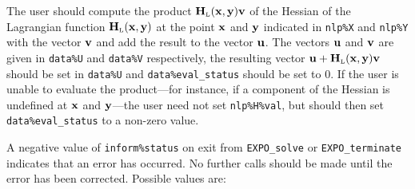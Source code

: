 \documentclass{galahad}
\newcommand{\packagename}{EXPO}
\newcommand{\bmHL}{\bmH\sub{L}}
\begin{document}
\begin{description}
 The user should compute the product $\bmHL(\bmx,\bmy) \bmv$ of the 
     Hessian of the Lagrangian function $\bmHL(\bmx,\bmy)$ at the point 
     ${\mathbf{x}}$ and ${\mathbf{y}}$ indicated in {\tt nlp\%X}  and {\tt nlp\%Y} with the 
     vector ${\mathbf{v}}$ and add the result to
     the vector ${\mathbf{u}}$. The vectors ${\mathbf{u}}$ and ${\mathbf{v}}$ are given in
     {\tt data\%U} and {\tt data\%V} respectively, the resulting
     vector $\bmu + \bmHL(\bmx,\bmy)\bmv$ should be set in {\tt data\%U}
     and  {\tt data\%eval\_status} should be set to 0. If the user is
     unable to evaluate the product---for instance, if a component of the 
     Hessian is undefined at ${\mathbf{x}}$ and ${\mathbf{y}}$---the user need not set 
    {\tt nlp\%H\%val}, but should then set {\tt data\%eval\_status} to a 
    non-zero value.
\end{description}



\galerrors
A negative value of {\tt inform\%status} on exit from
{\tt \packagename\_solve}
or
{\tt \packagename\_terminate}
indicates that an error has occurred. No further calls should be made
until the error has been corrected. Possible values are:
\end{document}
